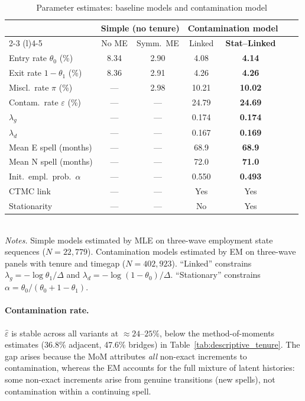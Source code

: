 \documentclass[12pt]{article}
\begin{document}
\begin{table}[H]
\centering
\caption{Parameter estimates: baseline models and contamination model}
\label{tab:eps_estimates}
\footnotesize
\begin{tabular}{@{}l cc cccc@{}}
\toprule
& \multicolumn{2}{c}{Simple (no tenure)} & \multicolumn{2}{c}{Contamination model} \\
\cmidrule(lr){2-3} \cmidrule(l){4-5}
& No ME & Symm.\ ME  & Linked & \textbf{Stat--Linked} \\
\midrule
Entry rate $\theta_0$ (\%) & 8.34 & 2.90 & 4.08 & \textbf{4.14} \\
Exit rate $1{-}\theta_1$ (\%) & 8.36 & 2.91 & 4.26 & \textbf{4.26} \\
Miscl.\ rate $\pi$ (\%) & --- & 2.98  & 10.21 & \textbf{10.02} \\
Contam.\ rate $\varepsilon$ (\%) & --- & ---  & 24.79 & \textbf{24.69} \\
$\lambda_g$ & --- & --- & 0.174 & \textbf{0.174} \\
$\lambda_d$ & --- & --- & 0.167 & \textbf{0.169} \\
\addlinespace
Mean E spell (months) & --- & --- & 68.9 & \textbf{68.9} \\
Mean N spell (months) & --- & ---  & 72.0 & \textbf{71.0} \\
Init.\ empl.\ prob.\ $\alpha$ & --- & ---  & 0.550 & \textbf{0.493} \\
\addlinespace
CTMC link & --- & --- & Yes & Yes \\
Stationarity & --- & ---  & No & Yes \\
\bottomrule
\end{tabular}\\[4pt]
{\footnotesize\textit{Notes.} Simple models estimated by MLE on three-wave
employment state sequences ($N=22{,}779$). Contamination models estimated
by EM on three-wave panels with tenure and timegap ($N=402{,}923$).
``Linked'' constrains $\lambda_g = -\log\theta_1/\Delta$ and
$\lambda_d = -\log(1-\theta_0)/\Delta$. ``Stationary'' constrains
$\alpha = \theta_0/(\theta_0 + 1 - \theta_1)$.}
\end{table}

\paragraph{Contamination rate.}
$\hat\varepsilon$ is stable across all variants at
$\approx 24$--$25\%$, below the method-of-moments estimates (36.8\%
adjacent, 47.6\% bridges) in Table~\ref{tab:descriptive_tenure}. The
gap arises because the MoM attributes \emph{all} non-exact increments
to contamination, whereas the EM accounts for the full mixture of latent
histories: some non-exact increments arise from genuine transitions (new
spells), not contamination within a continuing spell.
\end{document}
